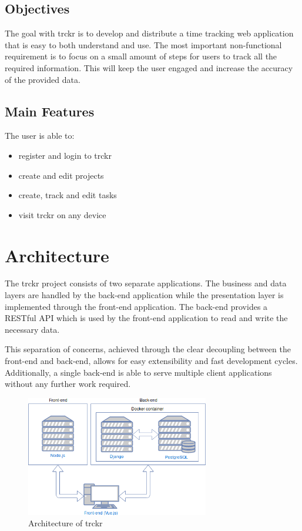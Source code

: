 \documentclass[bibliography=totoc, listof=totocnumbered]{scrartcl}
\begin{document}
\subsection{Objectives}
The goal with trckr is to develop and distribute a time tracking web application
that is easy to both understand and use. The most important non-functional
requirement is to focus on a small amount of steps for users to track all the
required information. This will keep the user engaged and increase the accuracy
of the provided data.

\subsection{Main Features}
The user is able to:
\begin{itemize}
    \item register and login to trckr
    \item create and edit projects
    \item create, track and edit tasks
    \item visit trckr on any device
\end{itemize}

\section{Architecture}
The trckr project consists of two separate applications. The business and data
layers are handled by the back-end application while the presentation layer is
implemented through the front-end application. The back-end provides a RESTful
API which is used by the front-end application to read and write the necessary
data.

This separation of concerns, achieved through the clear decoupling between the
front-end and back-end, allows for easy extensibility and fast development
cycles. Additionally, a single back-end is able to serve multiple client
applications without any further work required.

\begin{figure}[h]
    \includegraphics[width=8cm]{architecture}
    \caption{Architecture of trckr}
    \label{fig:architecture}
\end{figure}
\end{document}
